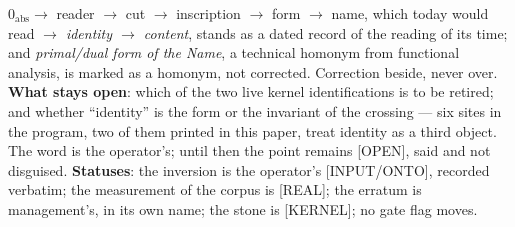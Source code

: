 \documentclass[11pt]{article}
\theoremstyle{definition}\newtheorem{deriv}{Derivation}
\begin{document}
$0_{\mathrm{abs}}\to$ reader $\to$ cut $\to$ inscription $\to$ form $\to$ name, which today would read \emph{$\to$ identity $\to$ content}, stands as a dated record of the reading of its time; and \emph{primal/dual form of the Name}, a technical homonym from functional analysis, is marked as a homonym, not corrected. Correction beside, never over. \textbf{What stays open}: which of the two live kernel identifications is to be retired; and whether ``identity'' is the form or the invariant of the crossing --- six sites in the program, two of them printed in this paper, treat identity as a third object. The word is the operator's; until then the point remains [OPEN], said and not disguised. \textbf{Statuses}: the inversion is the operator's [INPUT/ONTO], recorded verbatim; the measurement of the corpus is [REAL]; the erratum is management's, in its own name; the stone is [KERNEL]; no gate flag moves.
\end{document}

